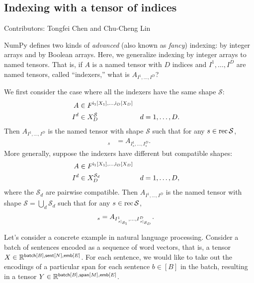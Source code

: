 \subsection{Indexing with a tensor of indices}

Contributors: Tongfei Chen and Chu-Cheng Lin

NumPy defines two kinds of \emph{advanced} (also known as \emph{fancy}) indexing: by integer arrays and by Boolean arrays. Here, we generalize indexing by integer arrays to named tensors. That is, if $A$ is a named tensor with $D$ indices and $I^1, \ldots, I^D$ are named tensors, called ``indexers,'' what is $A_{I^1, \ldots, I^D}$?

We first consider the case where all the indexers have the same shape $\mathcal{S}$:
\begin{align*}
  A &\in F^{\mathsf{i_\text{$1$}}[X_1], \ldots, \mathsf{i_\text{$D$}}[X_D]} \\
  I^d &\in X_D^{\mathcal{S}} & d &= 1, \ldots, D.
\end{align*}
Then $A_{I^1, \ldots, I^D}$ is the named tensor with shape $\mathcal{S}$ such that for any $s \in \operatorname{rec}{\mathcal{S}}$,
\begin{align*}
  [A_{I^1, \ldots, I^D}]_s &= A_{I^1_s, \ldots, I^D_s}.
\end{align*}
More generally, suppose the indexers have different but compatible shapes:
\begin{align*}
  A &\in F^{\mathsf{i_\text{$1$}}[X_1], \ldots, \mathsf{i_\text{$D$}}[X_D]} \\
  I^d &\in X_D^{\mathcal{S}_d} & d &= 1, \ldots, D,
\end{align*}
where the $\mathcal{S}_d$ are pairwise compatible. Then $A_{I^1, \ldots, I^D}$ is the named tensor with shape $\mathcal{S} = \bigcup_d \mathcal{S}_d$ such that for any $s \in \operatorname{rec}{\mathcal{S}}$,
\begin{align*}
  [A_{I^1, \ldots, I^D}]_s &= A_{I^1_{\restrict{s}{\mathcal{S}_1}}, \ldots, I^D_{\restrict{s}{\mathcal{S}_D}}}.
\end{align*}

Let's consider a concrete example in natural language processing. Consider a batch of sentences encoded as a sequence of word vectors, that is, a tensor $X \in \mathbb{R}^{\mathsf{batch}[B], \mathsf{sent}[N], \mathsf{emb}[E]}$. For each sentence, we would like to take out the encodings of a particular span for each sentence $b \in [B]$ in the batch, resulting in a tensor $Y \in \mathbb{R}^{\mathsf{batch}[B], \mathsf{span}[M], \mathsf{emb}[E]}$.


